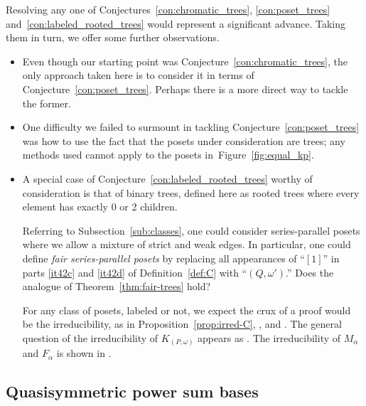 \documentclass[ALCO,Unicode,published]{cedram}
\newcommand{\om}{\omega}
\newcommand{\kpw}{K_{(P,\om)}}
\begin{document}
Resolving any one of Conjectures~\ref{con:chromatic_trees}, \ref{con:poset_trees} and~\ref{con:labeled_rooted_trees} would represent a significant advance.  Taking them in turn, we offer some further observations.

\begin{itemize}
\item Even though our starting point was Conjecture~\ref{con:chromatic_trees}, the only approach taken here is to consider it in terms of Conjecture~\ref{con:poset_trees}.  Perhaps there is a more direct way to tackle the former.  

\item One difficulty we failed to surmount in tackling Conjecture~\ref{con:poset_trees} was how to use the fact that the posets under consideration are trees; any methods used cannot apply to the posets in~Figure~\ref{fig:equal_kp}.

\item A special case of Conjecture~\ref{con:labeled_rooted_trees} worthy of consideration is that of binary trees, defined here as rooted trees where every element has exactly 0 or 2 children.  

Referring to Subsection~\ref{sub:classes}, one could consider series-parallel posets where we allow a mixture of strict and weak edges.   In particular, one could define \emph{fair series-parallel posets} by replacing all appearances of ``$[1]$'' in parts \ref{it42c} and \ref{it42d} of Definition~\ref{def:C} with ``$(Q, \om')$.''  Does the analogue of Theorem~\ref{thm:fair-trees} hold?

For any class of posets, labeled or not, we expect the crux of a proof would be the irreducibility, as in Proposition~\ref{prop:irred-C}, \cite[Lemma~3.13]{HaTs17}, and \cite[Theorem~4.19]{LiWe21}.  The general question of the irreducibility of $\kpw$ appears as \cite[Questions~7.2 and~7.3]{McWa14}. The irreducibility of $M_\alpha$ and $F_\alpha$ is shown in \cite{LaPy08}.
\end{itemize}

\subsection{Quasisymmetric power sum bases}
\end{document}
